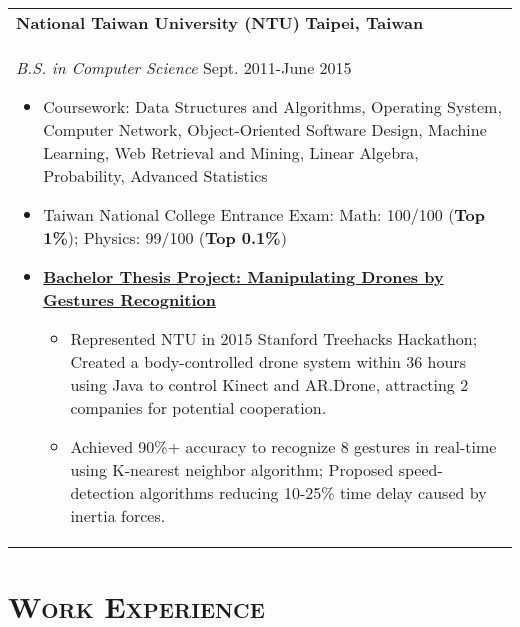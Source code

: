 \documentclass[a4paper,11pt]{article} %
\begin{document}
{\begin{tabular}{p{18.5cm}}
{\bf{National Taiwan University (NTU)}} \hfill \bf{Taipei, Taiwan}\\
{\it B.S. in Computer Science} \hfill Sept. 2011-June 2015
\begin{itemize}
\item Coursework: Data Structures and Algorithms, Operating System, Computer Network, Object-Oriented Software Design, Machine Learning, Web Retrieval and Mining, Linear Algebra, Probability, Advanced Statistics 
\item Taiwan National College Entrance Exam:  Math: 100/100 (\textbf{Top 1\%}); Physics: 99/100 (\textbf{Top 0.1\%})
\item \textbf{\href{https://www.youtube.com/watch?v=jxsZaQ6PcXU}{Bachelor Thesis Project: Manipulating Drones by Gestures Recognition}}
\begin{itemize}%
	\item Represented NTU in 2015 Stanford Treehacks Hackathon; Created a body-controlled drone system within 36 hours using Java to control Kinect and AR.Drone, attracting 2 companies for potential cooperation. 
	\item Achieved 90\%+ accuracy to recognize 8 gestures in real-time using K-nearest neighbor algorithm; Proposed speed-detection algorithms reducing 10-25\% time delay caused by inertia forces. \vspace*{-\baselineskip}
\end{itemize}
\end{itemize} 
\end{tabular}

\section{\Large\bf\textsc{Work Experience}}
\begin{tabular}{p{18.5cm}}


\end{tabular}}
\end{document}
